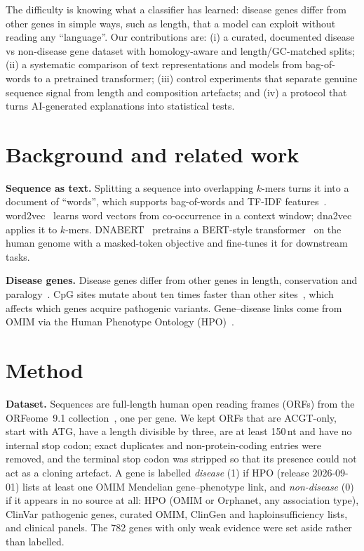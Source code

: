 \documentclass[11pt,a4paper,twocolumn]{article}
\begin{document}
The difficulty is knowing what a classifier has learned: disease genes differ
from other genes in simple ways, such as length, that a model can exploit without
reading any ``language''. Our contributions are:
(i) a curated, documented disease vs non-disease gene dataset with
homology-aware and length/GC-matched splits;
(ii) a systematic comparison of text representations and models from
bag-of-words to a pretrained transformer;
(iii) control experiments that separate genuine sequence signal from
length and composition artefacts; and
(iv) a protocol that turns AI-generated explanations into statistical tests.

\section{Background and related work}
\textbf{Sequence as text.} Splitting a sequence into overlapping $k$-mers turns
it into a document of ``words'', which supports bag-of-words and TF-IDF
features~\cite{russell2021aima}. word2vec~\cite{mikolov2013} learns word vectors
from co-occurrence in a context window; dna2vec~\cite{ng2017dna2vec} applies it to
$k$-mers. DNABERT~\cite{ji2021dnabert} pretrains a BERT-style
transformer~\cite{devlin2019bert} on the human genome with a masked-token
objective and fine-tunes it for downstream tasks.

\textbf{Disease genes.} Disease genes differ from other genes in length,
conservation and paralogy~\cite{lopezbigas2004}. CpG sites mutate about ten
times faster than other sites~\cite{hodgkinson2011}, which affects which genes
acquire pathogenic variants. Gene--disease links come from OMIM via the Human
Phenotype Ontology (HPO)~\cite{gargano2024hpo}.

\section{Method}
\textbf{Dataset.} Sequences are full-length human open reading frames (ORFs) from the
ORFeome~9.1 collection~\cite{orfeome2016}, one per gene. We kept ORFs that are
ACGT-only, start with ATG, have a length divisible by three, are at least 150\,nt
and have no internal stop codon; exact duplicates and non-protein-coding entries
were removed, and the terminal stop codon was stripped so that its presence
could not act as a cloning artefact. A gene is labelled \emph{disease} (1) if HPO
(release 2026-09-01) lists at least one OMIM Mendelian gene--phenotype link, and
\emph{non-disease} (0) if it appears in no source at all: HPO (OMIM or Orphanet,
any association type), ClinVar pathogenic genes, curated OMIM, ClinGen and
haploinsufficiency lists, and clinical panels. The 782 genes with only weak
evidence were set aside rather than labelled.
\end{document}

